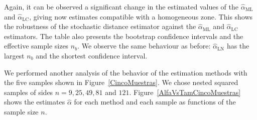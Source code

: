 \documentclass[twocolumn]{svjour3}
\begin{document}
Again, it can be observed a significant change in the estimated values of the $\widehat{\alpha}_{\text{{ML}}}$ and $\widehat{\alpha}_{\text{{LC}}}$, giving now estimates compatible with a homogeneous zone. This shows the robustness of the stochastic distance estimator against the $\widehat{\alpha}_{\text{{ML}}}$ and $\widehat{\alpha}_{\text{{LC}}}$ estimators.
The table also presents the bootstrap confidence intervals and the effective sample sizes $n_b$. 
We observe the same behaviour as before: $\widehat{\alpha}_{\text{{LN}}}$ has the largest $n_b$ and the shortest confidence interval.


We performed another analysis of the behavior of the estimation methods with the five samples shown in Figure~\ref{CincoMuestras}. 
We chose nested squared samples of sides $n=9,25,49,81$ and $121$. 
Figure~\ref{AlfaVsTamCincoMuestras} shows the estimates $\widehat{\alpha}$ for each method and each sample as functions of the sample size $n$. 
\end{document}
